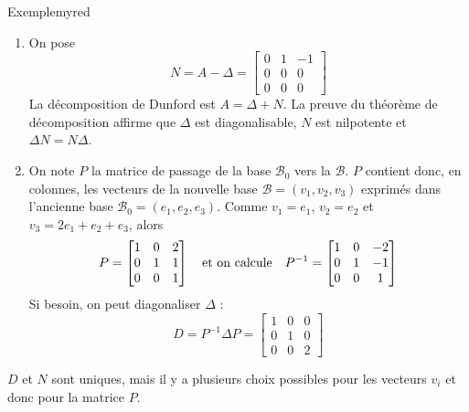 \begin{omed}{Exemple}{myred}
\begin{enumerate}
            \item On pose \[ N = A - \Delta = \begin{bmatrix}
                0 & 1 & -1 \\
                0 & 0 & 0 \\
                0 & 0 & 0
            \end{bmatrix}\] La décomposition de Dunford est $A = \Delta + N$. La preuve du théorème de décomposition affirme que $\Delta$ est diagonalisable, $N$ est nilpotente et $\Delta N = N \Delta$. 
            \item On note $P$ la matrice de passage de la base $\mathcal{B}_0$ vers la $\mathcal{B}$. $P$ contient donc, en colonnes, les vecteurs de la nouvelle base $\mathcal{B} = (v_1, v_2, v_3)$ exprimés dans l’ancienne base $\mathcal{B}_0 = (e_1, e_2, e_3)$. Comme $v_1 = e_1$, $v_2 = e_2$ et $v_3 = 2e_1 + e_2 + e_3$, alors 
            \[ P = \begin{bmatrix}
                1 & 0 & 2 \\
                0 & 1 & 1 \\
                0 & 0 & 1
            \end{bmatrix} \quad \text{et on calcule} \quad P^{-1} = \begin{bmatrix}
                1 & 0 & -2 \\
                0 & 1 & -1 \\
                0 & 0 & 1
            \end{bmatrix} \]   
            Si besoin, on peut diagonaliser $\Delta$ : 
            \[ D = P^{-1} \Delta P = \begin{bmatrix}
                1 & 0 & 0 \\
                0 & 1 & 0 \\
                0 & 0 & 2
            \end{bmatrix} \]    
        \end{enumerate}
    \end{omed}

    $D$ et $N$ sont uniques, mais il y a plusieurs choix possibles pour les vecteurs $v_i$ et donc pour la matrice $P$.

